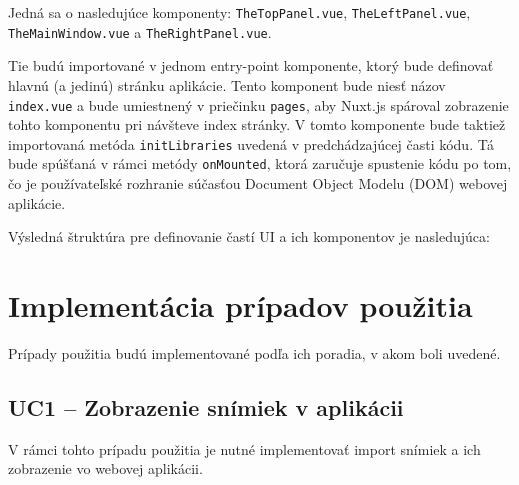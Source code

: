 Jedná sa o nasledujúce komponenty: \texttt{TheTopPanel.vue}, \texttt{TheLeftPanel.vue}, \texttt{TheMainWindow.vue} a \texttt{TheRightPanel.vue}.

Tie budú importované v jednom entry-point komponente, ktorý bude definovať hlavnú (a jedinú) stránku aplikácie. Tento komponent bude niesť názov \texttt{index.vue} a bude umiestnený v priečinku \texttt{pages}, aby Nuxt.js spároval zobrazenie tohto komponentu pri návšteve index stránky. V tomto komponente bude taktiež importovaná metóda \texttt{initLibraries} uvedená v predchádzajúcej časti kódu. Tá bude spúšťaná v rámci metódy \texttt{onMounted}, ktorá zaručuje spustenie kódu po tom, čo je používateľské rozhranie súčasťou Document Object Modelu (DOM) webovej aplikácie.

\clearpage

Výsledná štruktúra pre definovanie častí UI a ich komponentov je nasledujúca:
\begin{figure}[H]
\end{figure}

\section{Implementácia prípadov použitia}
Prípady použitia budú implementované podľa ich poradia, v akom boli uvedené.

\subsection {UC1 -- Zobrazenie snímiek v aplikácii}
V rámci tohto prípadu použitia je nutné implementovať import snímiek a ich zobrazenie vo webovej aplikácii.

